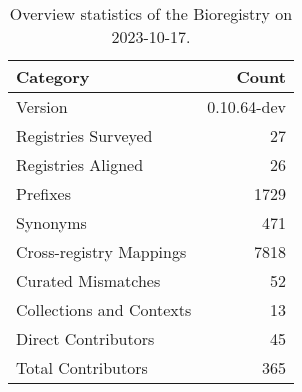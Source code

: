 \begin{table}
\caption{Overview statistics of the Bioregistry on 2023-10-17.}
\label{tab:bioregistry-summary}
\begin{tabular}{lr}
\toprule
Category & Count \\
\midrule
Version & 0.10.64-dev \\
Registries Surveyed & 27 \\
Registries Aligned & 26 \\
Prefixes & 1729 \\
Synonyms & 471 \\
Cross-registry Mappings & 7818 \\
Curated Mismatches & 52 \\
Collections and Contexts & 13 \\
Direct Contributors & 45 \\
Total Contributors & 365 \\
\bottomrule
\end{tabular}
\end{table}
